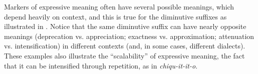 Markers of expressive meaning often have several possible meanings, which depend heavily on context, and this is true for the  diminutive suffixes as illustrated in 
.
Notice that the same diminutive suffix can have nearly opposite meanings (deprecation vs. appreciation; exactness vs. approximation; attenuation vs. intensification) in different contexts (and, in some cases, different dialects). These examples also illustrate the “scalability” of expressive meaning, the fact that it can be intensified through repetition, as in \textit{chiqu-it-it-o}.

















